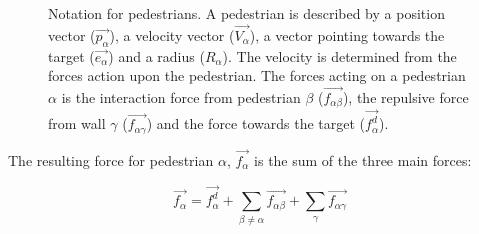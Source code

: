 \begin{figure}[ht]
    \centering
    \caption[Notation for pedestrians]{Notation for pedestrians.  
     A pedestrian is described by a position vector 
    ($\overrightarrow{p_{\alpha}}$), a velocity vector 
    ($\overrightarrow{V_{\alpha}}$), a vector pointing towards the target 
    ($\overrightarrow{e_{\alpha}}$)  and a radius ($R_{\alpha}$). The velocity 
    is determined from the forces action upon the pedestrian.  
     The forces acting on a pedestrian $\alpha$ is the
    interaction force from pedestrian $\beta$ 
    ($\overrightarrow{f_{\alpha\beta}}$), the repulsive force from wall  
    $\gamma$ ($\overrightarrow{f_{\alpha \gamma}}$) and the force towards the 
    target ($\overrightarrow{f^{d}_{\alpha}}$).}

    \label{pedestrian-notation}
\end{figure}

The resulting force for pedestrian $\alpha$, $\overrightarrow{f_{\alpha}}$ is
the sum of the three main forces:

\begin{equation}\label{model}
    \overrightarrow{f_{\alpha}} = \overrightarrow{f^{d}_{\alpha}} +
    \sum_{\beta \neq \alpha} \overrightarrow{f_{\alpha \beta}} +
    \sum_{\gamma} \overrightarrow{f_{\alpha \gamma}}
\end{equation}


